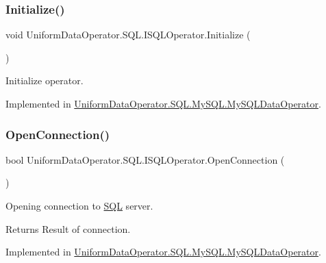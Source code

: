\subsubsection{\texorpdfstring{Initialize()}{Initialize()}}
{\footnotesize\ttfamily void Uniform\+Data\+Operator.\+S\+Q\+L.\+I\+S\+Q\+L\+Operator.\+Initialize (\begin{DoxyParamCaption}{ }\end{DoxyParamCaption})}



Initialize operator. 



Implemented in \mbox{\hyperlink{class_uniform_data_operator_1_1_s_q_l_1_1_my_s_q_l_1_1_my_s_q_l_data_operator_a40f968c5e4fd76b611eba5f59faa16c2}{Uniform\+Data\+Operator.\+S\+Q\+L.\+My\+S\+Q\+L.\+My\+S\+Q\+L\+Data\+Operator}}.

\mbox{\label{interface_uniform_data_operator_1_1_s_q_l_1_1_i_s_q_l_operator_aca1b52435a858e57db8d762026ceef2e}} 
\subsubsection{\texorpdfstring{Open\+Connection()}{OpenConnection()}}
{\footnotesize\ttfamily bool Uniform\+Data\+Operator.\+S\+Q\+L.\+I\+S\+Q\+L\+Operator.\+Open\+Connection (\begin{DoxyParamCaption}{ }\end{DoxyParamCaption})}



Opening connection to \mbox{\hyperlink{namespace_uniform_data_operator_1_1_s_q_l}{S\+QL}} server. 

\begin{DoxyReturn}{Returns}
Result of connection.
\end{DoxyReturn}


Implemented in \mbox{\hyperlink{class_uniform_data_operator_1_1_s_q_l_1_1_my_s_q_l_1_1_my_s_q_l_data_operator_acb5a33a4c04bb78290d2ee44ba8479f7}{Uniform\+Data\+Operator.\+S\+Q\+L.\+My\+S\+Q\+L.\+My\+S\+Q\+L\+Data\+Operator}}.

